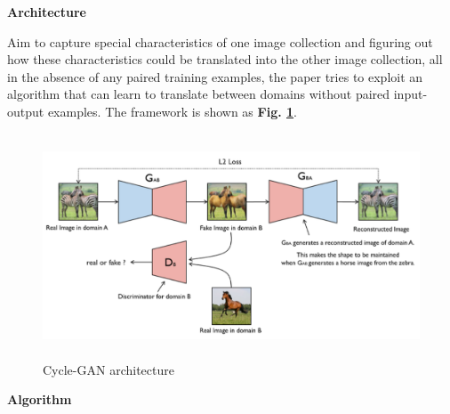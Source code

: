 \documentclass[a4paper]{article}
\begin{document}
\vspace{2mm}
\begin{center}
\large\textbf{Architecture} \\
\end{center}


\large{
Aim to capture special characteristics of one image collection and figuring out how these characteristics could be translated into the other image collection, all in the absence of any paired training examples, the paper tries to exploit an algorithm that can learn to translate between domains without paired input-output examples. The framework is shown as \textbf{Fig. \ref{cyclegan}}.

\vspace{3mm}
\begin{figure}[H]
\centering
\includegraphics[width=12.5cm,height=6.66cm]{cyclegan.png}
\caption{\textsf{Cycle-GAN architecture}}
\label{cyclegan}
\end{figure}
}

\vspace{5mm}
\begin{center}
\large\textbf{Algorithm} \\
\end{center}
\end{document}
